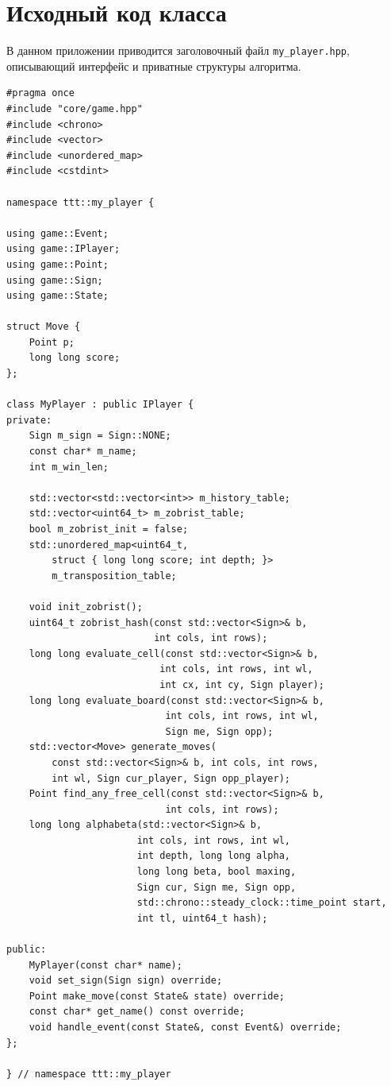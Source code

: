 \documentclass[a4paper,14pt]{extreport}
\begin{document}
\chapter{Исходный код класса}
В данном приложении приводится заголовочный файл \texttt{my\_player.hpp}, описывающий интерфейс и приватные структуры алгоритма.
\begin{lstlisting}
#pragma once
#include "core/game.hpp"
#include <chrono>
#include <vector>
#include <unordered_map>
#include <cstdint>

namespace ttt::my_player {

using game::Event;
using game::IPlayer;
using game::Point;
using game::Sign;
using game::State;

struct Move { 
    Point p; 
    long long score; 
};

class MyPlayer : public IPlayer {
private:
    Sign m_sign = Sign::NONE;
    const char* m_name;
    int m_win_len;
    
    std::vector<std::vector<int>> m_history_table;
    std::vector<uint64_t> m_zobrist_table;
    bool m_zobrist_init = false;
    std::unordered_map<uint64_t, 
        struct { long long score; int depth; }> 
        m_transposition_table;

    void init_zobrist();
    uint64_t zobrist_hash(const std::vector<Sign>& b, 
                          int cols, int rows);
    long long evaluate_cell(const std::vector<Sign>& b, 
                           int cols, int rows, int wl, 
                           int cx, int cy, Sign player);
    long long evaluate_board(const std::vector<Sign>& b, 
                            int cols, int rows, int wl, 
                            Sign me, Sign opp);
    std::vector<Move> generate_moves(
        const std::vector<Sign>& b, int cols, int rows, 
        int wl, Sign cur_player, Sign opp_player);
    Point find_any_free_cell(const std::vector<Sign>& b, 
                            int cols, int rows);
    long long alphabeta(std::vector<Sign>& b, 
                       int cols, int rows, int wl, 
                       int depth, long long alpha, 
                       long long beta, bool maxing, 
                       Sign cur, Sign me, Sign opp,
                       std::chrono::steady_clock::time_point start, 
                       int tl, uint64_t hash);

public:
    MyPlayer(const char* name);
    void set_sign(Sign sign) override;
    Point make_move(const State& state) override;
    const char* get_name() const override;
    void handle_event(const State&, const Event&) override;
};

} // namespace ttt::my_player
\end{lstlisting}
\end{document}

